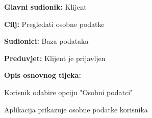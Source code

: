 					\noindent {}
					\begin{packed_item}
	
						\item \textbf{Glavni sudionik: } Klijent
						\item  \textbf{Cilj:} Pregledati osobne podatke
						\item  \textbf{Sudionici:} Baza podataka
						\item  \textbf{Preduvjet:} Klijent je prijavljen
						\item  \textbf{Opis osnovnog tijeka:}
						
						\item[] \begin{packed_enum}
	
							\item Korisnik odabire opciju "Osobni podatci"
							\item Aplikacija prikazuje osobne podatke korisnika

						\end{packed_enum}
						
						
					\end{packed_item}
					
